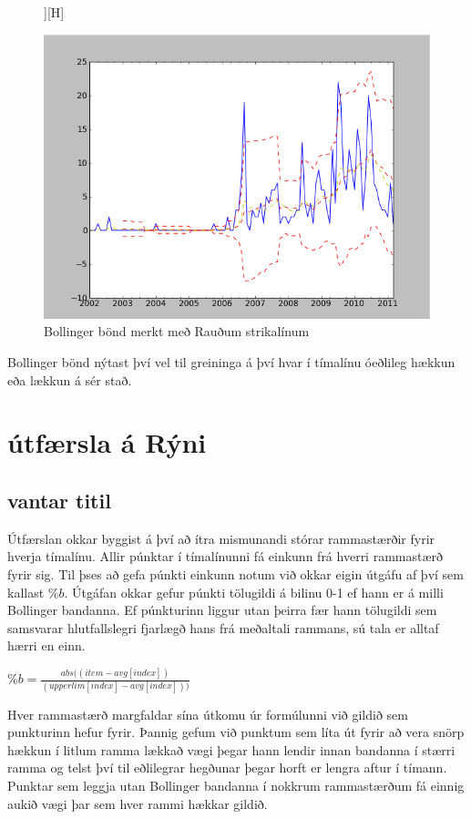 \documentclass{article}
\begin{document}
\begin{figure}][H]
 \begin{center}
  \includegraphics[width=.58\textwidth]{Bollinger.png} 
  \caption{Bollinger bönd merkt með Rauðum strikalínum} 
  \end{center}
\end{figure}


Bollinger bönd nýtast því vel til greininga á því hvar í
tímalínu óeðlileg hækkun eða lækkun á sér stað.






\section{útfærsla á Rýni}
\label{sec:implementation}


\subsection{vantar titil}
\label{sec:imp_our}

Útfærslan okkar byggist á því að ítra mismunandi stórar rammastærðir fyrir hverja tímalínu.
Allir púnktar í tímalínunni fá einkunn frá hverri rammastærð fyrir sig. 
Til þses að gefa púnkti einkunn notum við okkar eigin útgáfu af því sem kallast $\%b$. 
Útgáfan okkar gefur púnkti tölugildi á bilinu 0-1 ef hann er á milli Bollinger bandanna.
Ef púnkturinn liggur utan þeirra fær hann tölugildi sem samsvarar hlutfallslegri fjarlægð hans frá meðaltali rammans, 
sú tala er alltaf hærri en einn.

\begin{center}
  $\%b=\frac{abs((item - avg[index])}{(upperlim[index] - avg[index]))}$
\end{center}

{
  \color{red}
Hver rammastærð margfaldar sína útkomu úr formúlunni
við gildið sem punkturinn hefur fyrir.
}
Þannig gefum við punktum sem líta út fyrir að vera
snörp hækkun í litlum ramma lækkað vægi þegar hann
lendir innan bandanna í stærri ramma
og telst því til eðlilegrar hegðunar þegar horft er
lengra aftur í tímann.
Punktar sem leggja utan Bollinger bandanna í nokkrum
rammastærðum fá einnig aukið vægi þar sem hver rammi
hækkar gildið.
\end{document}
